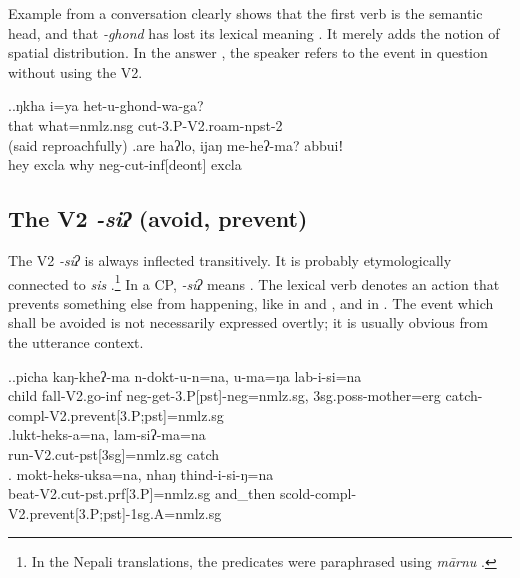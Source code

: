 Example \Next from a conversation clearly shows that the first verb is the semantic head, and that \emph{-ghond} has lost its lexical meaning . It  merely adds the notion of spatial distribution. In the answer \Next[b], the speaker refers to the event in question without using the V2. 

\ex.\ag.ŋkha i=ya                het-u-ghond-wa-ga?\\
that what{\sc =nmlz.nsg} cut{\sc -3.P-V2.roam-npst-2}\\
 (said reproachfully) 
\bg.are    haʔlo, ijaŋ me-heʔ-ma?    abbuiǃ\\
hey {\sc excla} why {\sc neg-}cut{\sc -inf[deont]} {\sc excla}\\
  

	

\subsection{The V2 \emph{-siʔ} (avoid, prevent)}\label{V2-avoid}
	
The V2 \emph{-siʔ} is always inflected transitively. It is probably etymologically connected to \emph{sis}  .\footnote{In the Nepali translations, the  predicates were paraphrased using \emph{mārnu} .} In a CP,  \emph{-siʔ} means . The lexical verb denotes an action that prevents something else from happening, like  in \Next[a] and \Next[b], and  in \Next[c].  The event which shall be avoided is not necessarily expressed overtly; it is usually obvious from the utterance context.
	
\ex.\ag.picha kaŋ-kheʔ-ma n-dokt-u-n=na, u-ma=ŋa lab-i-si=na\\
child fall{\sc -V2.go-inf} {\sc neg-}get{\sc -3.P[pst]-neg=nmlz.sg},  {\sc 3sg.poss-}mother{\sc =erg} catch{\sc -compl-V2.prevent[3.P;pst]=nmlz.sg}\\
\bg.lukt-heks-a=na, lam-siʔ-ma=na\\
run{\sc -V2.cut-pst[3sg]=nmlz.sg} catch\\
\bg. mokt-heks-uksa=na, nhaŋ thind-i-si-ŋ=na\\
beat{\sc -V2.cut-pst.prf[3.P]=nmlz.sg} and\_then scold{\sc -compl-V2.prevent[3.P;pst]-1sg.A=nmlz.sg}\\



